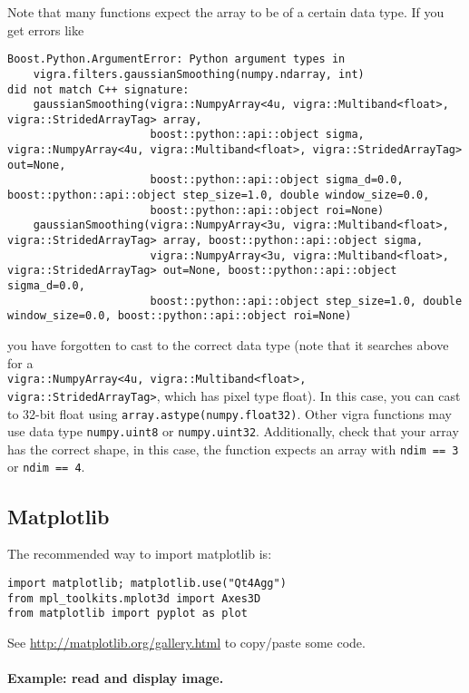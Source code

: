 \documentclass{../uebungsblatt}
\begin{document}
Note that many functions expect the array to be of a certain data type.
If you get errors like
\begin{tiny}
\begin{verbatim}
Boost.Python.ArgumentError: Python argument types in
    vigra.filters.gaussianSmoothing(numpy.ndarray, int)
did not match C++ signature:
    gaussianSmoothing(vigra::NumpyArray<4u, vigra::Multiband<float>, vigra::StridedArrayTag> array,
                      boost::python::api::object sigma, vigra::NumpyArray<4u, vigra::Multiband<float>, vigra::StridedArrayTag> out=None,
                      boost::python::api::object sigma_d=0.0, boost::python::api::object step_size=1.0, double window_size=0.0,
                      boost::python::api::object roi=None)
    gaussianSmoothing(vigra::NumpyArray<3u, vigra::Multiband<float>, vigra::StridedArrayTag> array, boost::python::api::object sigma,
                      vigra::NumpyArray<3u, vigra::Multiband<float>, vigra::StridedArrayTag> out=None, boost::python::api::object sigma_d=0.0,
                      boost::python::api::object step_size=1.0, double window_size=0.0, boost::python::api::object roi=None)
\end{verbatim}
\end{tiny}
you have forgotten to cast to the correct data type (note that it searches
above for a\\\verb!vigra::NumpyArray<4u, vigra::Multiband<float>, vigra::StridedArrayTag>!, which has pixel type float).
In this case, you can cast to 32-bit float using \lstinline!array.astype(numpy.float32)!.
Other vigra functions may use data type \lstinline!numpy.uint8! or \lstinline!numpy.uint32!.
Additionally, check that your array has the correct shape, in this case, the
function expects an array with \lstinline!ndim == 3! or \lstinline!ndim == 4!.

\subsection*{Matplotlib}
The recommended way to import matplotlib is:
\vspace*{-0.5em} \begin{lstlisting}
import matplotlib; matplotlib.use("Qt4Agg")
from mpl_toolkits.mplot3d import Axes3D
from matplotlib import pyplot as plot
\end{lstlisting}\vspace*{-0.5em}
See \url{http://matplotlib.org/gallery.html} to copy/paste some code.

\paragraph{Example: read and display image.}
\vspace*{1ex}

\end{document}
